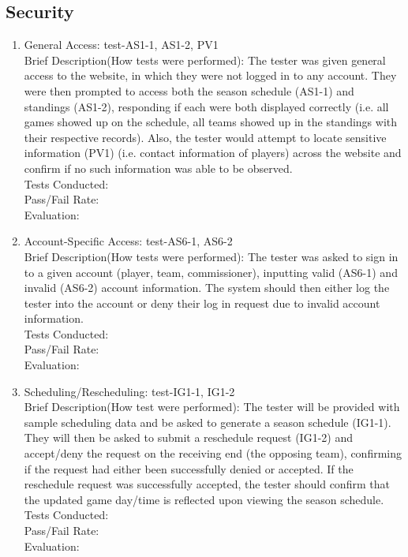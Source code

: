 \documentclass[12pt, titlepage]{article}
\begin{document}
\subsection{Security}

\begin{enumerate}
  \item{General Access: test-AS1-1, AS1-2, PV1\\}
  Brief Description(How tests were performed): The tester was given general access to the
  website, in which they were not logged in to any account. They were then prompted to
  access both the season schedule (AS1-1) and standings (AS1-2), responding if each
  were both displayed correctly (i.e. all games showed up on the schedule, all teams
  showed up in the standings with their respective records). Also, the tester would attempt
  to locate sensitive information (PV1) (i.e. contact information of players) across the
  website and confirm if no such information was able to be observed. \\
  Tests Conducted: \\
  Pass/Fail Rate: \\
  Evaluation: 
  \item{Account-Specific Access: test-AS6-1, AS6-2\\}
  Brief Description(How tests were performed): The tester was asked to sign in to a given
  account (player, team, commissioner), inputting valid (AS6-1) and invalid (AS6-2)
  account information. The system should then either log the tester into the account or
  deny their log in request due to invalid account information. \\
  Tests Conducted: \\
  Pass/Fail Rate: \\
  Evaluation: 
  \item{Scheduling/Rescheduling: test-IG1-1, IG1-2\\}
  Brief Description(How test were performed): The tester will be provided with sample
  scheduling data and be asked to generate a season schedule (IG1-1). They will then be
  asked to submit a reschedule request (IG1-2) and accept/deny the request on the receiving end
  (the opposing team), confirming if the request had either been successfully denied or
  accepted. If the reschedule request was successfully accepted, the tester should
  confirm that the updated game day/time is reflected upon viewing the season schedule. \\
  Tests Conducted: \\
  Pass/Fail Rate: \\
  Evaluation: 
\end{enumerate}
	
\end{document}
